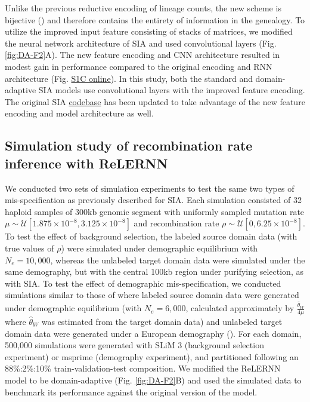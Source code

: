 Unlike the previous reductive encoding of lineage counts, the new scheme is bijective (\cite{kim_distance_2020}) and therefore contains the entirety of information in the genealogy. To utilize the improved input feature consisting of stacks of matrices, we modified the neural network architecture of \ac{SIA} and used convolutional layers (Fig. \ref{fig:DA-F2}A). The new feature encoding and \ac{CNN} architecture resulted in modest gain in performance compared to the original encoding and \ac{RNN} architecture (Fig. \href{https://journals.plos.org/plosgenetics/article?id=10.1371/journal.pgen.1011032#sec018}{S1C online}). In this study, both the standard and domain-adaptive \ac{SIA} models use convolutional layers with the improved feature encoding. The original \ac{SIA} \href{https://github.com/CshlSiepelLab/arg-selection}{codebase} has been updated to take advantage of the new feature encoding and model architecture as well.

\subsection{Simulation study of recombination rate inference with ReLERNN}

We conducted two sets of simulation experiments to test the same two types of mis-specification as previously described for \ac{SIA}. Each simulation consisted of 32 haploid samples of 300kb genomic segment with uniformly sampled mutation rate $\mu \sim \mathcal{U}[1.875\times 10^{-8}, 3.125\times 10^{-8}]$ and recombination rate $\rho \sim \mathcal{U}[0, 6.25\times 10^{-8}]$. To test the effect of background selection, the labeled source domain data (with true values of $\rho$) were simulated under demographic equilibrium with $N_e = 10,000$, whereas the unlabeled target domain data were simulated under the same demography, but with the central 100kb region under purifying selection, as with \ac{SIA}. To test the effect of demographic mis-specification, we conducted simulations similar to those of \cite{adrion_predicting_2020} where labeled source domain data were generated under demographic equilibrium (with $N_e = 6,000$, calculated approximately by $\frac{\hat{\theta}_W}{4\mu}$ where $\hat{\theta}_W$ was estimated from the target domain data) and unlabeled target domain data were generated under a European demography (\cite{tennessen_evolution_2012}). For each domain, 500,000 simulations were generated with SLiM 3 (background selection experiment) or msprime (demography experiment), and partitioned following an 88\%:2\%:10\% train-validation-test composition. We modified the ReLERNN model to be domain-adaptive (Fig. \ref{fig:DA-F2}B) and used the simulated data to benchmark its performance against the original version of the model.

